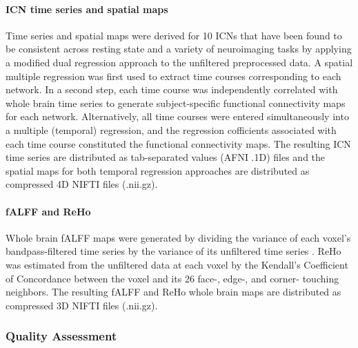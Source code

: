 \documentclass[preprint,12pt,3p]{elsarticle}
\begin{document}
\begin{itemize}
\paragraph{ICN time series and spatial maps} Time series and spatial maps were derived for 10 ICNs that have been found to be consistent across resting state and a variety of neuroimaging tasks  \cite{smith2009correspondence} by applying a modified dual regression approach \cite{Beckmann2009dualreg} to the unfiltered preprocessed data. A spatial multiple regression was first used to extract time courses corresponding to each network. In a second step, each time course was independently correlated with whole brain time series to generate subject-specific functional connectivity maps for each network. Alternatively, all time courses were entered simultaneously into a multiple (temporal) regression, and the regression cofficients associated with each time course constituted the functional connectivity maps. The resulting ICN time series are distributed as tab-separated values (AFNI .1D) files and the spatial maps for both temporal regression approaches are distributed as compressed 4D NIFTI files (.nii.gz).

\paragraph{fALFF and ReHo} Whole brain fALFF maps were generated by dividing the variance of each voxel's bandpass-filtered time series by the variance of its unfiltered time series \cite{zuo2008falff}. ReHo was estimated from the unfiltered data at each voxel by the Kendall's Coefficient of Concordance \cite{kendall1939w} between the voxel and its 26 face-, edge-, and corner- touching neighbors. The resulting fALFF and ReHo whole brain maps are distributed as compressed 3D NIFTI files (.nii.gz).

\subsubsection{Quality Assessment} 


\end{itemize}
\end{document}
